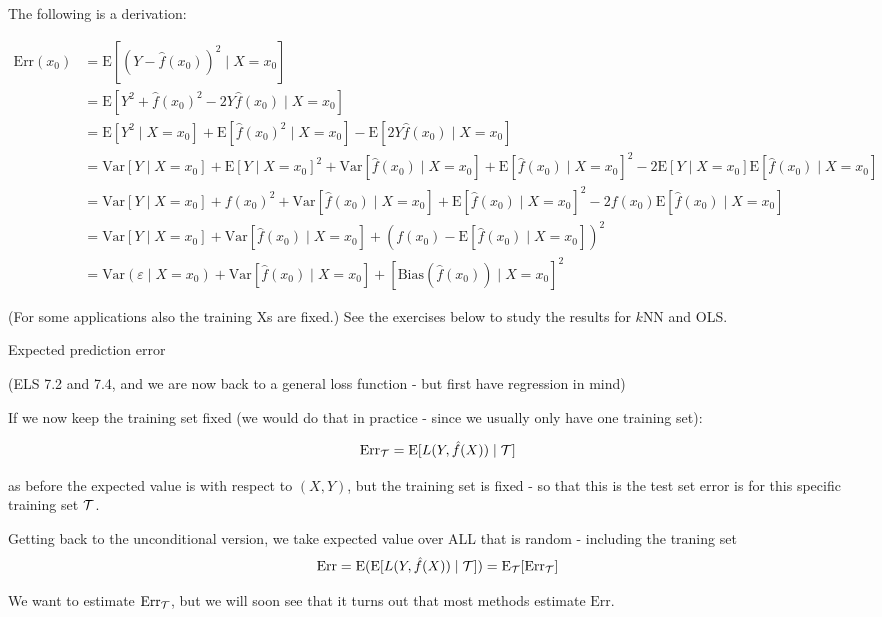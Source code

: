 \documentclass[
  ignorenonframetext,
]{beamer}
\begin{document}
\begin{frame}

The following is a derivation:

\small

\begin{align*} \text{Err}(x_0)&=\text{E}[(Y-\hat{f}(x_0))^2 \mid X=x_0]\\
&=\text{E}[Y^2 + \hat{f}(x_0)^2 - 2 Y \hat{f}(x_0)\mid X=x_0] \\
&= \text{E}[Y^2\mid X=x_0] + \text{E}[\hat{f}(x_0)^2\mid X=x_0] - \text{E}[2Y \hat{f}(x_0)\mid X=x_0]\\
&= \text{Var}[Y\mid X=x_0] + \text{E}[Y\mid X=x_0]^2 + \text{Var}[\hat{f}(x_0)\mid X=x_0] + \text{E}[\hat{f}(x_0)\mid X=x_0]^2 - 2 \text{E}[Y\mid X=x_0]\text{E}[\hat{f}(x_0)\mid X=x_0] \\
&= \text{Var}[Y\mid X=x_0]+f(x_0)^2+\text{Var}[\hat{f}(x_0)\mid X=x_0]+\text{E}[\hat{f}(x_0)\mid X=x_0]^2-2f(x_0)\text{E}[\hat{f}(x_0)\mid X=x_0]\\
&= \text{Var}[Y\mid X=x_0]+\text{Var}[\hat{f}(x_0)\mid X=x_0]+(f(x_0)-\text{E}[\hat{f}(x_0)\mid X=x_0])^2\\
&= \text{Var}(\varepsilon\mid X=x_0) +  \text{Var}[\hat{f}(x_0)\mid X=x_0]+[\text{Bias}(\hat{f}(x_0))\mid X=x_0]^2
\end{align*} \normalsize

(For some applications also the training Xs are fixed.) See the
exercises below to study the results for \(k\)NN and OLS.

\end{frame}

\begin{frame}

\begin{block}{Expected prediction error}

(ELS 7.2 and 7.4, and we are now back to a general loss function - but
first have regression in mind)

If we now keep the training set fixed (we would do that in practice -
since we usually only have one training set):

\[ \text{Err}_{\cal T}=\text{E}[L(Y,\hat{f}(X))\mid {\cal T}]\]

as before the expected value is with respect to \((X,Y)\), but the
training set is fixed - so that this is the test set error is for this
specific training set \({\cal T}\).

Getting back to the unconditional version, we take expected value over
ALL that is random - including the traning set
\[ \text{Err}=\text{E}(\text{E}[L(Y,\hat{f}(X))\mid {\cal T}])=\text{E}_{\cal T} [\text{Err}_{\cal T}]\]

We want to estimate \(\text{Err}_{\cal T}\), but we will soon see that
it turns out that most methods estimate \(\text{Err}\).

\end{block}

\end{frame}
\end{document}
